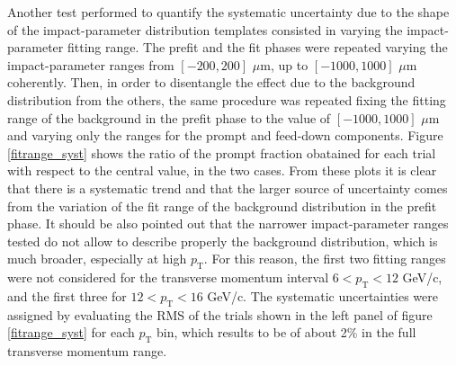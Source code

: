 \documentclass[b5paper,10pt,twoside,oldstyle,classica]{toptesi}
\newcommand{\pt}{p_\text{T}}
\begin{document}
Another test performed to quantify the systematic uncertainty due to the shape of the impact-parameter distribution templates consisted in varying the impact-parameter fitting range. The prefit and the fit phases were repeated varying the impact-parameter ranges from $[-200,200]$ $\mu$m, up to $[-1000,1000]$ $\mu$m coherently. Then, in order to disentangle the effect due to the background distribution from the others, the same procedure was repeated fixing the fitting range of the background in the prefit phase to the value of $[-1000,1000]$ $\mu$m and varying only the ranges for the prompt and feed-down components. Figure \ref{fitrange_syst} shows the ratio of the prompt fraction obatained for each trial with respect to the central value, in the two cases. From these plots it is clear that there is a systematic trend and that the larger source of uncertainty comes from the variation of the fit range of the background distribution in the prefit phase. It should be also pointed out that the narrower impact-parameter ranges tested do not allow to describe properly the background distribution, which is much broader, especially at high $\pt$. For this reason, the first two fitting ranges were not considered for the transverse momentum interval $6<\pt<12$ GeV/c, and the first three for $12<\pt<16$ GeV/c. The systematic uncertainties were assigned by evaluating the RMS of the trials shown in the left panel of figure \ref{fitrange_syst} for each $\pt$ bin, which results to be of about 2\% in the full transverse momentum range.  
\end{document}
